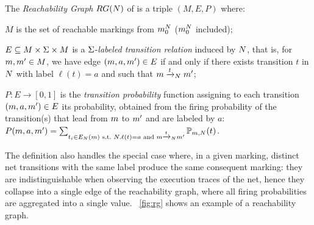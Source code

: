 \begin{definition}
The \emph{Reachability Graph} $RG(N)$ of \uswn \net is a triple $(M,E,P)$ where:
\begin{inparaenum}[\itshape (i)]
\item $M$ is the set of reachable markings from $m_0^{N}$ ($m_0^{N}$ included);
\item $E \subseteq M \times \Sigma \times M$ is a $\Sigma$-\emph{labeled transition relation} induced by $N$, that is, for $m,m' \in M$, we have edge $(m,a,m') \in E$ if and only if there exists transition $t$ in $N$ with label $\ell(t) = a$ and such that $m\xrightarrow{t}_{N}m'$;
\item $P:E \rightarrow [0,1]$ is the \emph{transition probability} function assigning to each transition $(m,a,m') \in E$ its  probability, obtained from the firing probability of the \uswn transition(s) that lead from $m$ to $m'$ and are labeled by $a$: $P(m,a,m') = \sum_{t_i \in E_{N}(m) \text{ s.t.~} N.\ell(t) = a \text{ and } m\xrightarrow{t}_{N}m'} \mathbb{P}_{m,N}(t)$.
\end{inparaenum}
\end{definition}
The definition also handles the special case where, in a given marking, distinct net transitions with the same label produce the same consequent marking: they are indistinguishable when observing the execution traces of the net, hence they collapse into a single edge of the reachability graph, where all firing probabilities are aggregated into a single value.
\figurename~\ref{fig:rg} shows an example of a reachability graph.



